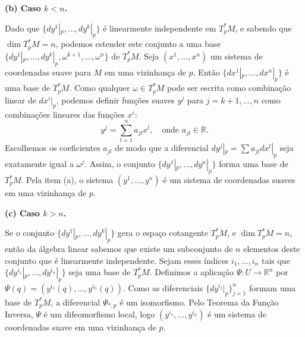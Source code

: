 {	\textbf{(b) Caso $k < n$.}
	
	Dado que $\{dy^1|_p, \dots, dy^k|_p\}$ é linearmente independente em $T_p^* M$, e sabendo que $\dim T_p^* M = n$, podemos estender este conjunto a uma base $\{dy^1|_p, \dots, dy^k|_p, \omega^{k+1}, \dots, \omega^n\}$ de $T_p^* M$.
	Seja $(x^1, \dots, x^n)$ um sistema de coordenadas suave para $M$ em uma vizinhança de $p$. Então $\{dx^1|_p, \dots, dx^n|_p\}$ é uma base de $T_p^* M$. Como qualquer $\omega \in T_p^* M$ pode ser escrita como combinação linear de $dx^i|_p$, podemos definir funções suaves $y^j$ para $j = k+1, \dots, n$ como combinações lineares das funções $x^i$:
	\begin{equation*}
		y^j = \sum_{l=1}^n a_{jl} x^l, \quad \text{onde } a_{jl} \in \mathbb{R}.
	\end{equation*}
	Escolhemos os coeficientes $a_{jl}$ de modo que a diferencial $dy^j|_p = \sum a_{jl} dx^l|_p$ seja exatamente igual a $\omega^j$. Assim, o conjunto $\{dy^1|_p, \dots, dy^n|_p\}$ forma uma base de $T_p^* M$. Pela item (a), o sistema $(y^1, \dots, y^n)$ é um sistema de coordenadas suaves em uma vizinhança de $p$.
	
	\textbf{(c) Caso $k > n$.}
	
	Se o conjunto $\{dy^1|_p, \dots, dy^k|_p\}$ gera o espaço cotangente $T_p^* M$, e $\dim T_p^* M = n$, então da álgebra linear sabemos que existe um subconjunto de $n$ elementos deste conjunto que é linearmente independente.
	Sejam esses índices $i_1, \dots, i_n$ tais que $\{dy^{i_1}|_p, \dots, dy^{i_n}|_p\}$ seja uma base de $T_p^* M$.
	Definimos a aplicação $\Psi : U \to \mathbb{R}^n$ por $\Psi(q) = (y^{i_1}(q), \dots, y^{i_n}(q))$. Como as diferenciais $\{dy^{i_j}|_p\}_{j=1}^n$ formam uma base de $T_p^* M$, a diferencial $\Psi_{*,p}$ é um isomorfismo. Pelo Teorema da Função Inversa, $\Psi$ é um difeomorfismo local, logo $(y^{i_1}, \dots, y^{i_n})$ é um sistema de coordenadas suave em uma vizinhança de $p$.
}


